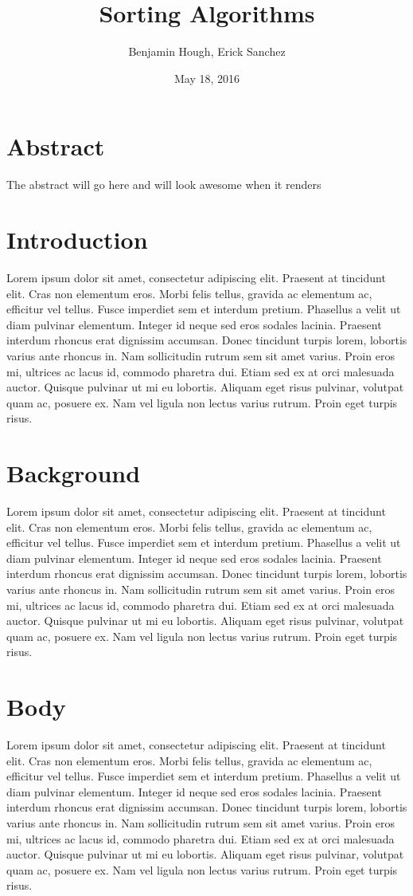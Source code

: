 \documentclass[12pt]{article}
\title{Sorting Algorithms}
\author{Benjamin Hough, Erick Sanchez}
\date{May 18, 2016}
\begin{document}
	\maketitle
	\section*{Abstract}
	The abstract will go here and will look awesome when it renders
	
	\tableofcontents
	\pagebreak
	
	\section{Introduction}
	Lorem ipsum dolor sit amet, consectetur adipiscing elit. Praesent at tincidunt elit. Cras non elementum eros. Morbi felis tellus, gravida ac elementum ac, efficitur vel tellus. Fusce imperdiet sem et interdum pretium. Phasellus a velit ut diam pulvinar elementum. Integer id neque sed eros sodales lacinia. Praesent interdum rhoncus erat dignissim accumsan. Donec tincidunt turpis lorem, lobortis varius ante rhoncus in. Nam sollicitudin rutrum sem sit amet varius. Proin eros mi, ultrices ac lacus id, commodo pharetra dui. Etiam sed ex at orci malesuada auctor. Quisque pulvinar ut mi eu lobortis. Aliquam eget risus pulvinar, volutpat quam ac, posuere ex. Nam vel ligula non lectus varius rutrum. Proin eget turpis risus.
	
	
	\section{Background}
	Lorem ipsum dolor sit amet, consectetur adipiscing elit. Praesent at tincidunt elit. Cras non elementum eros. Morbi felis tellus, gravida ac elementum ac, efficitur vel tellus. Fusce imperdiet sem et interdum pretium. Phasellus a velit ut diam pulvinar elementum. Integer id neque sed eros sodales lacinia. Praesent interdum rhoncus erat dignissim accumsan. Donec tincidunt turpis lorem, lobortis varius ante rhoncus in. Nam sollicitudin rutrum sem sit amet varius. Proin eros mi, ultrices ac lacus id, commodo pharetra dui. Etiam sed ex at orci malesuada auctor. Quisque pulvinar ut mi eu lobortis. Aliquam eget risus pulvinar, volutpat quam ac, posuere ex. Nam vel ligula non lectus varius rutrum. Proin eget turpis risus.
	
	
	\section{Body}
	Lorem ipsum dolor sit amet, consectetur adipiscing elit. Praesent at tincidunt elit. Cras non elementum eros. Morbi felis tellus, gravida ac elementum ac, efficitur vel tellus. Fusce imperdiet sem et interdum pretium. Phasellus a velit ut diam pulvinar elementum. Integer id neque sed eros sodales lacinia. Praesent interdum rhoncus erat dignissim accumsan. Donec tincidunt turpis lorem, lobortis varius ante rhoncus in. Nam sollicitudin rutrum sem sit amet varius. Proin eros mi, ultrices ac lacus id, commodo pharetra dui. Etiam sed ex at orci malesuada auctor. Quisque pulvinar ut mi eu lobortis. Aliquam eget risus pulvinar, volutpat quam ac, posuere ex. Nam vel ligula non lectus varius rutrum. Proin eget turpis risus.
	
\end{document}
